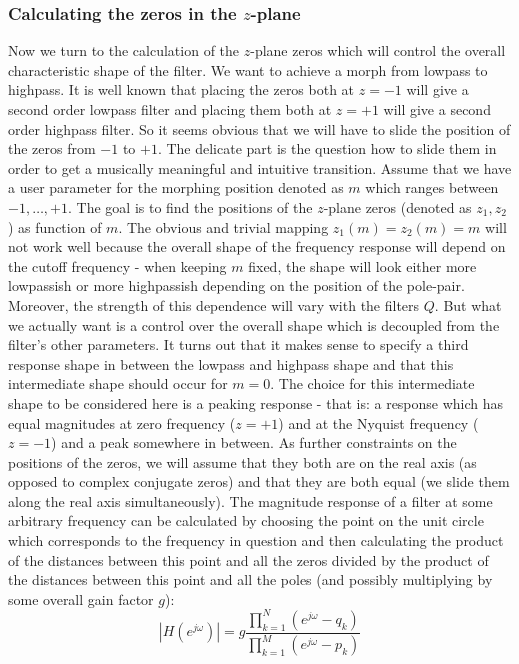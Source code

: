 \subsubsection{Calculating the zeros in the $z$-plane}
Now we turn to the calculation of the $z$-plane zeros which will control the overall characteristic shape of the filter. We want to achieve a morph from lowpass to highpass. It is well known that placing the zeros both at $z=-1$ will give a second order lowpass filter and placing them both at $z=+1$ will give a second order highpass filter. So it seems obvious that we will have to slide the position of the zeros from $-1$ to $+1$. The delicate part is the question how to slide them in order to get a musically meaningful and intuitive transition. Assume that we have a user parameter for the morphing position denoted as $m$ which ranges between $-1, \ldots, +1$. The goal is to find the positions of the $z$-plane zeros (denoted as $z_1, z_2$) as function of $m$. The obvious and trivial mapping $z_1(m) = z_2(m) = m$ will not work well because the overall shape of the frequency response will depend on the cutoff frequency - when keeping $m$ fixed, the shape will look either more lowpassish or more highpassish depending on the position of the pole-pair. Moreover, the strength of this dependence will vary with the filters $Q$. But what we actually want is a control over the overall shape which is decoupled from the filter's other parameters. It turns out that it makes sense to specify a third response shape in between the lowpass and highpass shape and that this intermediate shape should occur for $m=0$. The choice for this intermediate shape to be considered here is a peaking response - that is: a response which has equal magnitudes at zero frequency ($z=+1$) and at the Nyquist frequency ($z=-1$) and a peak somewhere in between. As further constraints on the positions of the zeros, we will assume that they both are on the real axis (as opposed to complex conjugate zeros) and that they are both equal (we slide them along the real axis simultaneously). The magnitude response of a filter at some arbitrary frequency can be calculated by choosing the point on the unit circle which corresponds to the frequency in question and then calculating the product of the distances between this point and all the zeros divided by the product of the distances between this point and all the poles (and possibly multiplying by some overall gain factor $g$):
\begin{equation}
 |H(e^{j \omega})| = g \frac{\prod_{k=1}^{N} (e^{j \omega} - q_k) }{\prod_{k=1}^{M} (e^{j \omega} - p_k)   }
\end{equation}
